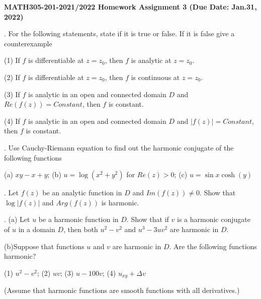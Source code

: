 %
%
\textwidth=6.8in
\textheight=8.8in
\oddsidemargin=-0.1in
\evensidemargin=-0.1in








\noindent
{\bf MATH305-201-2021/2022 Homework Assignment 3 (Due Date: Jan.31, 2022) }

\vskip 0.5cm


. For the following statements, state if it is true or false. If it is false give a counterexample

(1) If $f$ is differentiable at $z=z_0$, then $f$ is analytic at $z=z_0$.

 (2) If $f$ is differentiable at $z=z_0$, then $f$ is continuous at $z=z_0$.

(3) If $f$ is analytic in an open and connected domain $D$ and $ Re(f(z))=Constant$, then $ f$ is constant.

(4) If $f$ is analytic in an open and connected domain $D$ and $ |f(z)| =Constant$, then $ f$ is constant.



\medskip

. Use Cauchy-Riemann equation to find out the harmonic conjugate of the following functions

(a) $ xy-x+y$; (b) $ u= \log (x^2+y^2)$  for $ Re (z)>0$; (c)  $ u=\sin x \cosh (y)$

\medskip


.    Let $f(z)$ be an analytic function in $D$ and $ Im (f(z)) \not =0$. Show that $ \log |f (z)|$ and $ Arg (f(z))$ is harmonic.




\medskip

. (a) Let $ u$ be a harmonic function in $D$. Show that if $v$ is a harmonic conjugate of $u$ in a domain $D$, then both $u^2-v^2$ and $ u^3 -3 u v^2$  are harmonic in $D$.

(b)Suppose that functions $u$ and $v$ are harmonic in $D$.  Are the following functions harmonic?

(1) $ u^2-v^2$; (2) $ uv $;  (3) $ u-100 v$; (4) $ u_{xy}+ \Delta v$


(Assume that harmonic functions are smooth functions with all derivatives.)



\medskip

